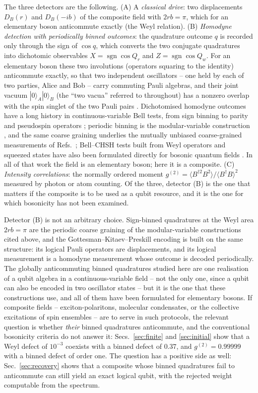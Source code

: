 \documentclass[11pt,a4paper]{article}
\newcommand{\sgn}{\operatorname{sgn}}
\newcommand{\ket}[1]{|#1\rangle}
\begin{document}
The three detectors are the following. (A) A \emph{classical drive}: two displacements $D_B(r)$ and $D_B(-ib)$ of the composite field with $2rb=\pi$, which for an elementary boson anticommute exactly (the Weyl relation). (B) \emph{Homodyne detection with periodically binned outcomes}: the quadrature outcome $q$ is recorded only through the sign of $\cos q$, which converts the two conjugate quadratures into dichotomic observables $X=\sgn\cos Q_r$ and $Z=\sgn\cos Q_w$. For an elementary boson these two involutions (operators squaring to the identity) anticommute exactly, so that two independent oscillators -- one held by each of two parties, Alice and Bob -- carry commuting Pauli algebras, and their joint vacuum $\ket0_A\ket0_B$ (the ``two vacua'' referred to throughout) has a nonzero overlap with the spin singlet of the two Pauli pairs \cite{Sorella2026}. Dichotomised homodyne outcomes have a long history in continuous-variable Bell tests, from sign binning \cite{Gilchrist1998,Munro1999,Wenger2003,GarciaPatron2004} to parity and pseudospin operators \cite{Banaszek1999,Chen2002}; periodic binning is the modular-variable construction \cite{Aharonov1969,VernazGris2014,Ketterer2016}, and the same coarse graining underlies the mutually unbiased coarse-grained measurements of Refs.~\cite{Tasca2018,Paul2018}; Bell--CHSH tests built from Weyl operators and squeezed states have also been formulated directly for bosonic quantum fields \cite{Dudal2023}. In all of that work the field is an elementary boson; here it is a composite. (C) \emph{Intensity correlations}: the normally ordered moment $g^{(2)}=\langle B^{\dagger2}B^2\rangle/\langle B^\dagger B\rangle^2$ measured by photon or atom counting. Of the three, detector (B) is the one that matters if the composite is to be used as a qubit resource, and it is the one for which bosonicity has not been examined.

Detector (B) is not an arbitrary choice. Sign-binned quadratures at the Weyl area $2rb=\pi$ are the periodic coarse graining of the modular-variable constructions cited above, and the Gottesman--Kitaev--Preskill encoding \cite{GKP2001} is built on the same structure: its logical Pauli operators are displacements, and its logical measurement is a homodyne measurement whose outcome is decoded periodically. The globally anticommuting binned quadratures studied here are one realisation of a qubit algebra in a continuous-variable field -- not the only one, since a qubit can also be encoded in two oscillator states -- but it is the one that these constructions use, and all of them have been formulated for elementary bosons. If composite fields -- exciton-polaritons, molecular condensates, or the collective excitations of spin ensembles -- are to serve in such protocols, the relevant question is whether \emph{their} binned quadratures anticommute, and the conventional bosonicity criteria do not answer it: Secs.~\ref{sec:finite} and \ref{sec:initial} show that a Weyl defect of $10^{-3}$ coexists with a binned defect of $0.37$, and $g^{(2)}=0.99999$ with a binned defect of order one. The question has a positive side as well: Sec.~\ref{sec:recovery} shows that a composite whose binned quadratures fail to anticommute can still yield an exact logical qubit, with the rejected weight computable from the spectrum.
\end{document}
